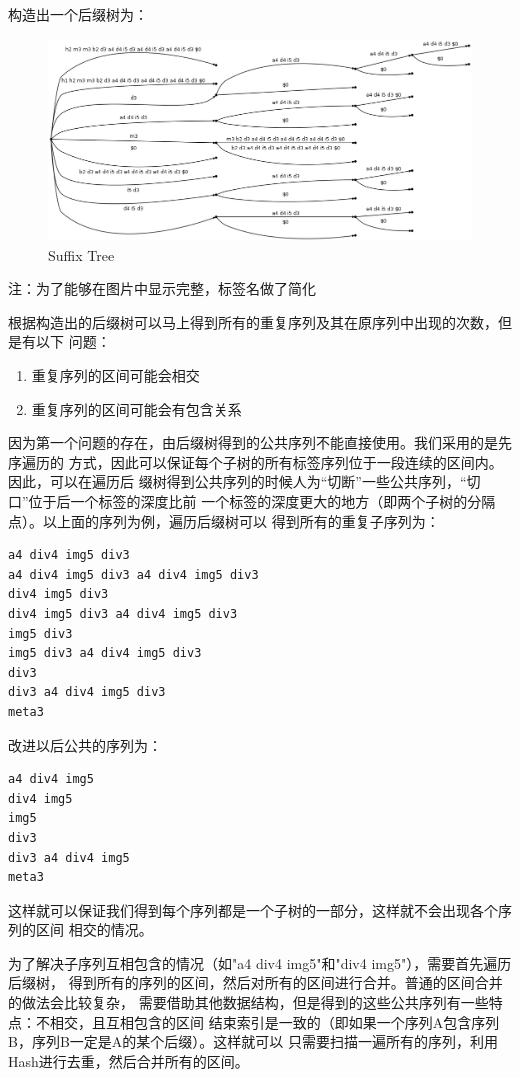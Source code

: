 \documentclass{article}
\begin{document}
构造出一个后缀树为：
\begin{figure}[htb]
\centering
\includegraphics[width=\textwidth]{./tree.png}
\caption{\label{fig:2}Suffix Tree}
\end{figure}

注：为了能够在图片中显示完整，标签名做了简化

根据构造出的后缀树可以马上得到所有的重复序列及其在原序列中出现的次数，但是有以下
问题：
\begin{enumerate}
\item 重复序列的区间可能会相交
\item 重复序列的区间可能会有包含关系
\end{enumerate}

因为第一个问题的存在，由后缀树得到的公共序列不能直接使用。我们采用的是先序遍历的
方式，因此可以保证每个子树的所有标签序列位于一段连续的区间内。因此，可以在遍历后
缀树得到公共序列的时候人为“切断”一些公共序列，“切口”位于后一个标签的深度比前
一个标签的深度更大的地方（即两个子树的分隔点）。以上面的序列为例，遍历后缀树可以
得到所有的重复子序列为：
\begin{verbatim}
a4 div4 img5 div3
a4 div4 img5 div3 a4 div4 img5 div3
div4 img5 div3
div4 img5 div3 a4 div4 img5 div3
img5 div3
img5 div3 a4 div4 img5 div3
div3
div3 a4 div4 img5 div3
meta3
\end{verbatim}

改进以后公共的序列为：
\begin{verbatim}
a4 div4 img5
div4 img5
img5
div3
div3 a4 div4 img5
meta3
\end{verbatim}

这样就可以保证我们得到每个序列都是一个子树的一部分，这样就不会出现各个序列的区间
相交的情况。

为了解决子序列互相包含的情况（如"a4 div4 img5"和"div4 img5"），需要首先遍历后缀树，
得到所有的序列的区间，然后对所有的区间进行合并。普通的区间合并的做法会比较复杂，
需要借助其他数据结构，但是得到的这些公共序列有一些特点：不相交，且互相包含的区间
结束索引是一致的（即如果一个序列A包含序列B，序列B一定是A的某个后缀）。这样就可以
只需要扫描一遍所有的序列，利用Hash进行去重，然后合并所有的区间。
\end{document}

